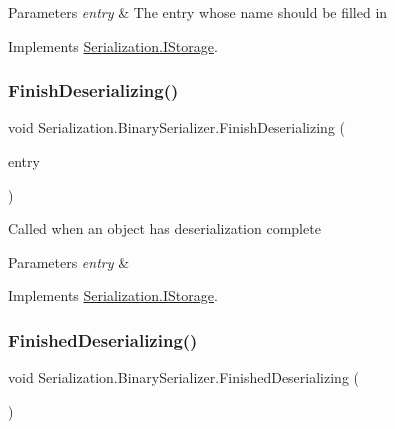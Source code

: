 \begin{DoxyParams}{Parameters}
{\em entry} & The entry whose name should be filled in\\
\hline
\end{DoxyParams}


Implements \hyperlink{interface_serialization_1_1_i_storage_ad17a92256ad7a7196084e05bad968567}{Serialization.\+I\+Storage}.

\mbox{\label{class_serialization_1_1_binary_serializer_ad89d25a0b56c1b568f6696ab8d04d10b}} 
\subsubsection{\texorpdfstring{Finish\+Deserializing()}{FinishDeserializing()}}
{\footnotesize\ttfamily void Serialization.\+Binary\+Serializer.\+Finish\+Deserializing (\begin{DoxyParamCaption}\item[{\hyperlink{class_serialization_1_1_entry}{Entry}}]{entry }\end{DoxyParamCaption})\hspace{0.3cm}{\ttfamily [inline]}}



Called when an object has deserialization complete 


\begin{DoxyParams}{Parameters}
{\em entry} & \\
\hline
\end{DoxyParams}


Implements \hyperlink{interface_serialization_1_1_i_storage_a8377dea6764882fb9882d0bd92e03de6}{Serialization.\+I\+Storage}.

\mbox{\label{class_serialization_1_1_binary_serializer_af70f7fb26c0b41d0f1126634df2de03a}} 
\subsubsection{\texorpdfstring{Finished\+Deserializing()}{FinishedDeserializing()}}
{\footnotesize\ttfamily void Serialization.\+Binary\+Serializer.\+Finished\+Deserializing (\begin{DoxyParamCaption}{ }\end{DoxyParamCaption})\hspace{0.3cm}{\ttfamily [inline]}}




